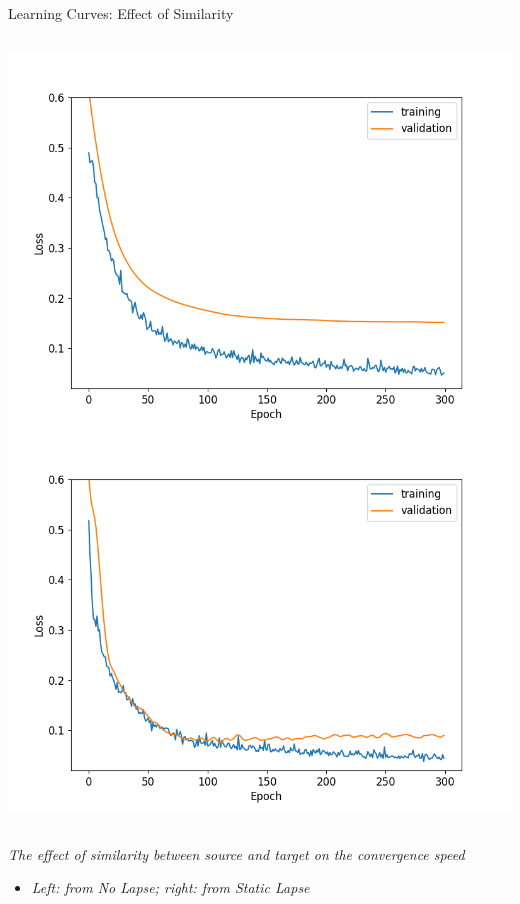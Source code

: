     \begin{frame}{Learning Curves: Effect of Similarity}
    \begin{columns}
    \includegraphics[height=0.8\textheight]{../project3/figures/figure3a.png}
    \includegraphics[height=0.8\textheight]{../project3/figures/figure3b.png}
    \end{columns}
    
    \textit{The effect of similarity between source and target on the convergence speed}
    \begin{itemize}
        \item \textit{Left: from No Lapse; right: from Static Lapse}
    \end{itemize}
    \end{frame}
    
